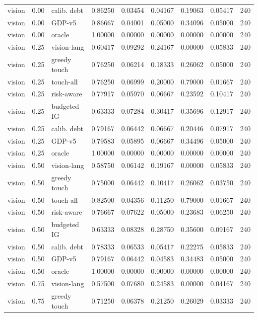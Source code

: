 \documentclass{article}
\begin{document}
\begin{center}
\begin{longtable}{lllllllll}
vision & 0.00 & calib. debt & 0.86250 & 0.03454 & 0.04167 & 0.19063 & 0.05417 & 240 \\
vision & 0.00 & GDP-v5 & 0.86667 & 0.04001 & 0.05000 & 0.34096 & 0.05000 & 240 \\
vision & 0.00 & oracle & 1.00000 & 0.00000 & 0.00000 & 0.00000 & 0.00000 & 240 \\
vision & 0.25 & vision-lang & 0.60417 & 0.09292 & 0.24167 & 0.00000 & 0.05833 & 240 \\
vision & 0.25 & greedy touch & 0.76250 & 0.06214 & 0.18333 & 0.26062 & 0.05000 & 240 \\
vision & 0.25 & touch-all & 0.76250 & 0.06999 & 0.20000 & 0.79000 & 0.01667 & 240 \\
vision & 0.25 & risk-aware & 0.77917 & 0.05970 & 0.06667 & 0.23592 & 0.10417 & 240 \\
vision & 0.25 & budgeted IG & 0.63333 & 0.07284 & 0.30417 & 0.35696 & 0.12917 & 240 \\
vision & 0.25 & calib. debt & 0.79167 & 0.06442 & 0.06667 & 0.20446 & 0.07917 & 240 \\
vision & 0.25 & GDP-v5 & 0.79583 & 0.05895 & 0.06667 & 0.34496 & 0.05000 & 240 \\
vision & 0.25 & oracle & 1.00000 & 0.00000 & 0.00000 & 0.00000 & 0.00000 & 240 \\
vision & 0.50 & vision-lang & 0.58750 & 0.06142 & 0.19167 & 0.00000 & 0.05833 & 240 \\
vision & 0.50 & greedy touch & 0.75000 & 0.06442 & 0.10417 & 0.26062 & 0.03750 & 240 \\
vision & 0.50 & touch-all & 0.82500 & 0.04356 & 0.11250 & 0.79000 & 0.01667 & 240 \\
vision & 0.50 & risk-aware & 0.76667 & 0.07622 & 0.05000 & 0.23683 & 0.06250 & 240 \\
vision & 0.50 & budgeted IG & 0.63333 & 0.08328 & 0.28750 & 0.35600 & 0.09167 & 240 \\
vision & 0.50 & calib. debt & 0.78333 & 0.06533 & 0.05417 & 0.22275 & 0.05833 & 240 \\
vision & 0.50 & GDP-v5 & 0.79167 & 0.06442 & 0.04583 & 0.34483 & 0.05000 & 240 \\
vision & 0.50 & oracle & 1.00000 & 0.00000 & 0.00000 & 0.00000 & 0.00000 & 240 \\
vision & 0.75 & vision-lang & 0.57500 & 0.07680 & 0.24583 & 0.00000 & 0.04167 & 240 \\
vision & 0.75 & greedy touch & 0.71250 & 0.06378 & 0.21250 & 0.26029 & 0.03333 & 240 \\

\end{longtable}
\end{center}
\end{document}
